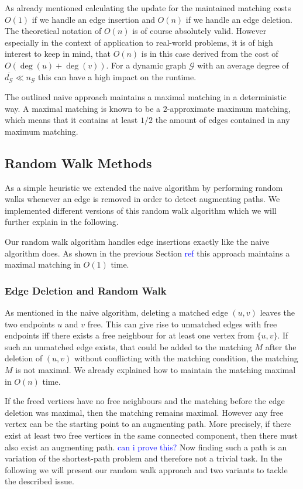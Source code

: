\documentclass{article}      %
\newcommand\todo[1]{\textcolor{blue}{#1}}
\begin{document}
As already mentioned calculating the update for the maintained matching costs $O(1)$ if we handle an edge insertion and $O(n)$ if we handle an edge deletion. The theoretical notation of $O(n)$ is of course absolutely valid. However especially in the context of application to real-world problems, it is of high interest to keep in mind, that $O(n)$ is in this case derived from the cost of $O(\deg(u) + \deg(v))$. For a dynamic graph $\mathcal{G}$ with an average degree of $\overline{d_{\mathcal{G}}} \ll n_{\mathcal{G}}$ this can have a high impact on the runtime.

The outlined naive approach maintains a maximal matching in a deterministic way. A maximal matching is known to be a $2$-approximate maximum matching, which means that it contains at least $1/2$ the amount of edges contained in any maximum matching.

\subsection{Random Walk Methods}
\label{sec:random-walk}

As a simple heuristic we extended the naive algorithm by performing random walks whenever an edge is removed in order to detect augmenting paths. We implemented different versions of this random walk algorithm which we will further explain in the following.

Our random walk algorithm handles edge insertions exactly like the naive algorithm does. As shown in the previous Section \todo{ref} this approach maintains a maximal matching in $O(1)$ time.

\subsubsection{Edge Deletion and Random Walk}
\label{sec:rw-edge-out}

As mentioned in the naive algorithm, deleting a matched edge $(u,v)$ leaves the two endpoints $u$ and $v$ free. This can give rise to unmatched edges with free endpoints iff there exists a free neighbour for at least one vertex from $\{u,v\}$. If such an unmatched edge exists, that could be added to the matching $M$ after the deletion of $(u,v)$ without conflicting with the matching condition, the matching $M$ is not maximal. We already explained how to maintain the matching maximal in $O(n)$ time. 

If the freed vertices have no free neighbours and the matching before the edge deletion was maximal, then the matching remains maximal. However any free vertex can be the starting point to an augmenting path. More precisely, if there exist at least two free vertices in the same connected component, then there must also exist an augmenting path. \todo{can i prove this?} Now finding such a path is an variation of the shortest-path problem and therefore not a trivial task. In the following we will present our random walk approach and two variants to tackle the described issue.
\end{document}
